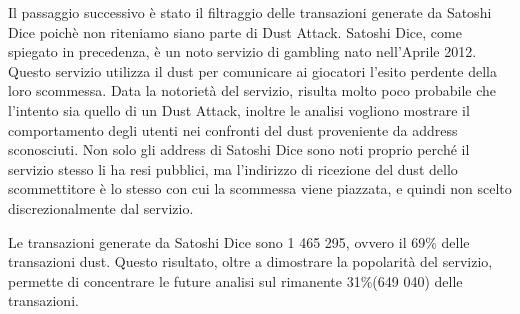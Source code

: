 Il passaggio successivo è stato il filtraggio delle transazioni generate da Satoshi Dice poichè non riteniamo siano parte di Dust Attack. Satoshi Dice, come spiegato in precedenza, è un noto servizio di gambling nato nell'Aprile 2012. Questo servizio utilizza il dust per comunicare ai giocatori l'esito perdente della loro scommessa. Data la notorietà del servizio, risulta molto poco probabile che l'intento sia quello di un Dust Attack, inoltre le analisi vogliono mostrare il comportamento degli utenti nei confronti del dust proveniente da address sconosciuti. Non solo gli address di Satoshi Dice sono noti proprio perché il servizio stesso li ha resi pubblici, ma l'indirizzo di ricezione del dust dello scommettitore è lo stesso con cui la scommessa viene piazzata, e quindi non scelto discrezionalmente dal servizio.

Le transazioni generate da Satoshi Dice sono 1 465 295, ovvero il 69\% delle transazioni dust. Questo risultato, oltre a dimostrare la popolarità del servizio, permette di concentrare le future analisi sul rimanente 31\%(649 040) delle transazioni.

